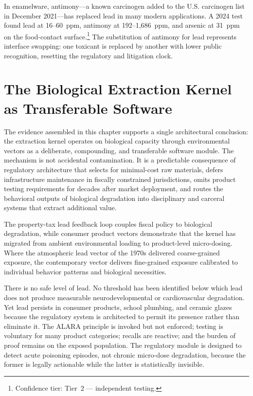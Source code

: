 In enamelware, antimony---a known carcinogen added to the U.S. carcinogen list
in December 2021---has replaced lead in many modern applications. A 2024 test
found lead at 16--60~ppm, antimony at 192--1,686~ppm, and arsenic at 31~ppm on
the food-contact surface.\footnote{Confidence tier: Tier~2 --- independent
testing.} The substitution of antimony for lead represents interface swapping:
one toxicant is replaced by another with lower public recognition, resetting
the regulatory and litigation clock.

\section{The Biological Extraction Kernel as Transferable Software}

The evidence assembled in this chapter supports a single architectural
conclusion: the extraction kernel operates on biological capacity through
environmental vectors as a deliberate, compounding, and transferable software
module. The mechanism is not accidental contamination. It is a predictable
consequence of regulatory architecture that selects for minimal-cost raw
materials, defers infrastructure maintenance in fiscally constrained
jurisdictions, omits product testing requirements for decades after market
deployment, and routes the behavioral outputs of biological degradation into
disciplinary and carceral systems that extract additional value.

The property-tax lead feedback loop couples fiscal policy to biological
degradation, while consumer product vectors demonstrate that the kernel has
migrated from ambient environmental loading to product-level micro-dosing.
Where the atmospheric lead vector of the 1970s delivered coarse-grained
exposure, the contemporary vector delivers fine-grained exposure calibrated to
individual behavior patterns and biological necessities.

There is no safe level of lead. No threshold has been identified below which
lead does not produce measurable neurodevelopmental or cardiovascular
degradation. Yet lead persists in consumer products, school plumbing, and
ceramic glazes because the regulatory system is architected to permit its
presence rather than eliminate it. The ALARA principle is invoked but not
enforced; testing is voluntary for many product categories; recalls are
reactive; and the burden of proof remains on the exposed population. The
regulatory module is designed to detect acute poisoning episodes, not chronic
micro-dose degradation, because the former is legally actionable while the
latter is statistically invisible.

